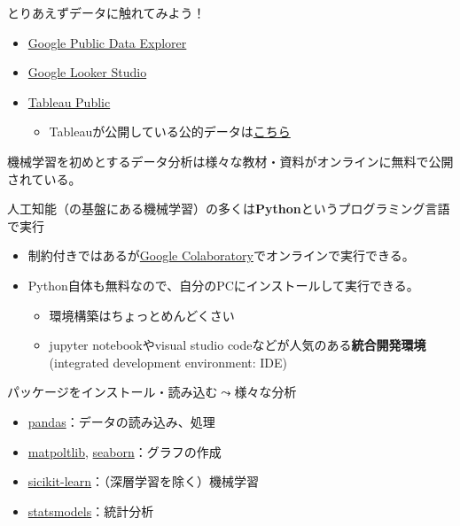 \documentclass[
  xelatex,
  ja=standard]{bxjsarticle}
\providecommand{\tightlist}{%
  \setlength{\itemsep}{0pt}\setlength{\parskip}{0pt}}\usepackage{longtable,booktabs,array}
\begin{document}
とりあえずデータに触れてみよう！

\begin{itemize}
\tightlist
\item
  \href{https://www.google.co.jp/publicdata/directory}{Google Public
  Data Explorer}
\item
  \href{https://www.tableau.com/learn/articles/free-public-data-sets}{Google
  Looker Studio}
\item
  \href{https://public.tableau.com/app/discover}{Tableau Public}

  \begin{itemize}
  \tightlist
  \item
    Tableauが公開している公的データは\href{https://www.tableau.com/learn/articles/free-public-data-sets}{こちら}
  \end{itemize}
\end{itemize}

機械学習を初めとするデータ分析は様々な教材・資料がオンラインに無料で公開されている。

人工知能（の基盤にある機械学習）の多くは\textbf{Python}というプログラミング言語で実行

\begin{itemize}
\tightlist
\item
  制約付きではあるが\href{https://colab.research.google.com/}{Google
  Colaboratory}でオンラインで実行できる。
\item
  Python自体も無料なので、自分のPCにインストールして実行できる。

  \begin{itemize}
  \tightlist
  \item
    環境構築はちょっとめんどくさい
  \item
    jupyter notebookやvisual studio
    codeなどが人気のある\textbf{統合開発環境} (integrated development
    environment: IDE)
  \end{itemize}
\end{itemize}

パッケージをインストール・読み込む\(\leadsto\)様々な分析

\begin{itemize}
\tightlist
\item
  \href{https://pandas.pydata.org/}{pandas}：データの読み込み、処理
\item
  \href{https://matplotlib.org/}{matpoltlib},
  \href{https://seaborn.pydata.org/}{seaborn}：グラフの作成
\item
  \href{https://scikit-learn.org/stable/}{sicikit-learn}：（深層学習を除く）機械学習
\item
  \href{https://www.statsmodels.org/stable/}{statsmodels}：統計分析
\end{itemize}
\end{document}
